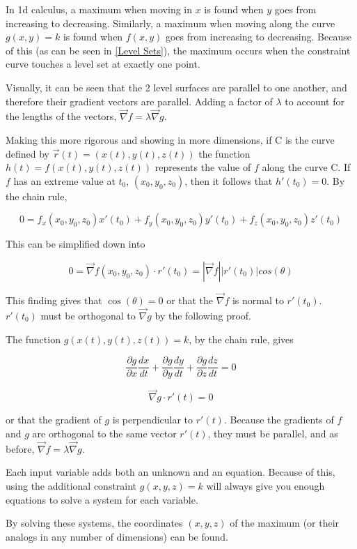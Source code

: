 \documentclass{notes}
\begin{document}

In 1d calculus, a maximum when moving in \(x\) is found when \(y\) goes from increasing to decreasing. Similarly, a maximum when moving along the curve \(g(x,y) = k\) is found when \(f(x, y)\) goes from increasing to decreasing. Because of this (as can be seen in \autoref{Level Sets}), the maximum occurs when the constraint curve touches a level set at exactly one point.

Visually, it can be seen that the 2 level surfaces are parallel to one another, and therefore their gradient vectors are parallel. Adding a factor of \(\lambda\) to account for the lengths of the vectors, \(\vec{\nabla} f = \lambda \vec{\nabla}g\).

Making this more rigorous and showing in more dimensions, if C is the curve defined by \(\vec{r}(t) = (x(t), y(t), z(t))\) the function \(h(t) = f(x(t), y(t), z(t))\) represents the value of \(f\) along the curve C. If \(f\) has an extreme value at \(t_0\), \((x_0, y_0, z_0)\), then it follows that \(h'(t_0) = 0\). By the chain rule,

\[0 = f_x(x_0, y_0, z_0) x'(t_0) + f_y(x_0, y_0, z_0) y'(t_0) + f_z(x_0, y_0, z_0) z'(t_0)\]

This can be simplified down into

\[0 = \vec{\nabla} f(x_0, y_0, z_0) \cdot r'(t_0) = |\vec{\nabla}f| |r'(t_0)| cos(\theta)\]

This finding gives that \(\cos(\theta) = 0\) or that the \(\vec{\nabla}f\) is normal to \(r'(t_0)\). \(r'(t_0)\) must be orthogonal to \(\vec{\nabla}g\) by the following proof.

The function \(g(x(t), y(t), z(t)) = k\), by the chain rule, gives

\[\frac{\partial g}{\partial x} \frac{d x}{d t}+\frac{\partial g}{\partial y} \frac{d y}{d t}+\frac{\partial g}{\partial z} \frac{d z}{d t}=0\]

\[\vec{\nabla} g \cdot r'(t) = 0\]

or that the gradient of \(g\) is perpendicular to \(r'(t)\). Because the gradients of \(f\) and \(g\) are orthogonal to the same vector \(r'(t)\), they must be parallel, and as before, \(\vec{\nabla}f = \lambda \vec{\nabla}g\).

Each input variable adds both an unknown and an equation. Because of this, using the additional constraint \(g(x, y, z) = k\) will always give you enough equations to solve a system for each variable.

By solving these systems, the coordinates \((x, y, z)\) of the maximum (or their analogs in any number of dimensions) can be found.
\end{document}

